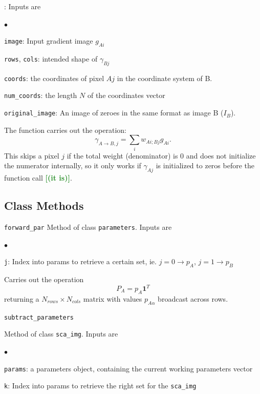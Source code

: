 \documentclass[12pt]{pasj01}
\newcommand{\Katherine}[1]{{\textcolor{ForestGreen}{\bfseries{[#1]}}}}
\begin{document}
: Inputs are
\begin{list}{$\bullet$}{}
\item {\tt image}: Input gradient image $g_{Ai}$ 
\item {\tt rows}, {\tt cols}: intended shape of $\gamma_{Bj}$ 
\item {\tt coords}: the coordinates of pixel $Aj$ in the coordinate system of B. 
\item {\tt num\_coords}: the length $N$ of the coordinates vector
\item {\tt original\_image}: An image of zeroes in the same format as image B ($I_{B}$).
\end{list}
The function carries out the operation:
\begin{equation}
    \gamma_{A\to B, j} = \sum_i w_{Ai;Bj} g_{Ai}.
\end{equation}
This skips a pixel $j$ if the total weight (denominator) is 0 and does not initialize the numerator internally, so it only works if $\gamma_{Aj}$ is initialized to zeros before the function call \Katherine{(it is)}.

\subsection{Class Methods}

{\tt forward\_par}
Method of class {\tt parameters}. Inputs are
\begin{list}{$\bullet$}{}
\item {\tt j}: Index into params to retrieve a certain set, ie. $j=0\to p_{A}$, $j=1\to p_{B}$
\end{list}

Carries out the operation
\begin{equation}
    P_A = p_{A}{\textbf{1}}^T
\end{equation}
returning a $N_{rows}\times N_{cols}$ matrix with values $p_{A\alpha}$ broadcast across rows.

\vskip 0.05in

{\tt subtract\_parameters}

Method of class {\tt sca\_img}. Inputs are
\begin{list}{$\bullet$}{}
\item {\tt params}: a parameters object, containing the current working parameters vector
\item {\tt k}: Index into params to retrieve the right set for the {\tt sca\_img} 
\end{list}
\end{document}
